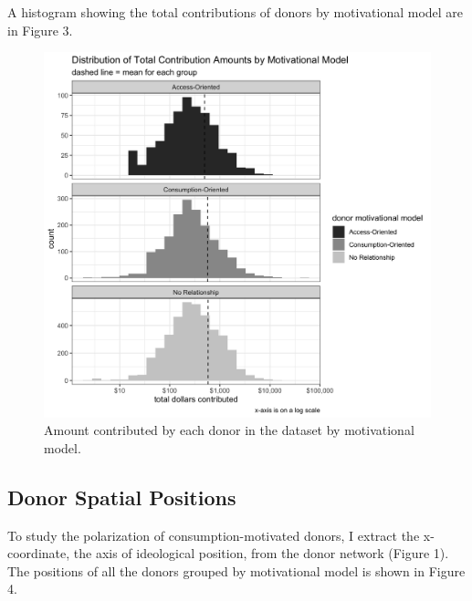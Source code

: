 \documentclass[12pt,]{article}
\begin{document}
A histogram showing the total contributions of donors by motivational
model are in Figure 3.

\begin{figure}
\centering
\includegraphics{../tables_and_figures/fig_donor_sizes.jpg}
\caption{Amount contributed by each donor in the dataset by motivational
model.}
\end{figure}

\hypertarget{donor-spatial-positions}{%
\subsection{Donor Spatial Positions}\label{donor-spatial-positions}}

To study the polarization of consumption-motivated donors, I extract the
x-coordinate, the axis of ideological position, from the donor network
(Figure 1). The positions of all the donors grouped by motivational
model is shown in Figure 4.
\end{document}
